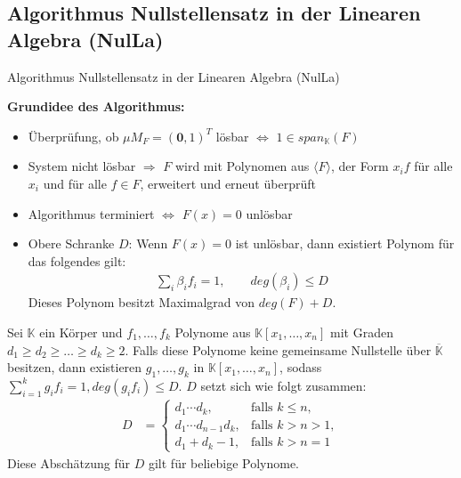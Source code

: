 \subsection{Algorithmus Nullstellensatz in der Linearen Algebra (NulLa)}
\begin{mslide}{Algorithmus Nullstellensatz in der Linearen Algebra (NulLa)}

\textbf{Grundidee des Algorithmus:} 
\begin{itemize}
\item Überprüfung, ob $\mu M_F = (\textbf{0},1)^T$ lösbar $\Leftrightarrow$ $1 \in span_\mathbb{K}(F)$ 
\item System nicht lösbar $\Rightarrow$ $F$ wird mit Polynomen aus $\langle F \rangle$, der Form $x_if$ für alle $x_i$ und für alle $f \in F$, erweitert und erneut überprüft 
\item Algorithmus terminiert $\Leftrightarrow$ $F(x) = 0$ unlösbar 
\item Obere Schranke $D$: Wenn $F(x) = 0$ ist unlösbar, dann existiert Polynom für das folgendes gilt: 
\begin{align*}
\sum_i \beta_i f_i = 1, \qquad deg(\beta_i)\le D
\end{align*}
Dieses Polynom besitzt Maximalgrad von $deg(F)+D$.
\end{itemize}

\begin{lem} \label{Kollar}
Sei $\mathbb{K}$ ein Körper und $f_1,\ldots,f_k$ Polynome aus $\mathbb{K}[x_1,\ldots,x_n]$ mit Graden $d_1\ge d_2 \ge \ldots \ge d_k \ge 2$. Falls diese Polynome keine gemeinsame Nullstelle über $\overline{\mathbb{K}}$ besitzen, dann existieren $g_1,\ldots,g_k$ in $\mathbb{K}[x_1,\ldots,x_n]$, sodass $\sum_{i=1}^k g_if_i=1, deg(g_if_i) \le D$. $D$ setzt sich wie folgt zusammen:
\begin{align*}
D &= \begin{cases} d_1\cdots d_k, & \text{falls $k \le n$}, \\ d_1\cdots d_{n-1}d_k, &
  \text{falls $k > n > 1$}, \\ d_1+d_k-1, & \text{falls $k > n = 1$} \end{cases}
\end{align*} 
Diese Abschätzung für $D$ gilt für beliebige Polynome.
\end{lem}

\framebreak

\begin{center}
\end{center}
\end{mslide}
